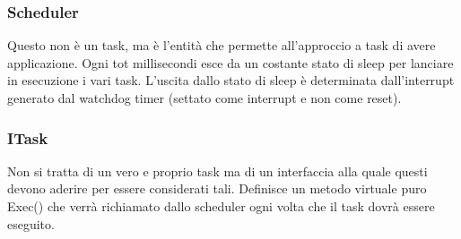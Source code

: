 \documentclass{article}
\begin{document}
\begin{center}
\end{center}

\subsubsection{Scheduler}
Questo non è un task, ma è l'entità che permette all'approccio a task di avere applicazione. Ogni tot millisecondi esce da un costante stato di sleep per lanciare in esecuzione i vari task. L'uscita dallo stato di sleep è determinata dall'interrupt generato dal watchdog timer (settato come interrupt e non come reset).

\subsubsection{ITask}
Non si tratta di un vero e proprio task ma di un interfaccia alla quale questi devono aderire per essere considerati tali. Definisce un metodo virtuale puro Exec() che verrà richiamato dallo scheduler ogni volta che il task dovrà essere eseguito.
\end{document}
